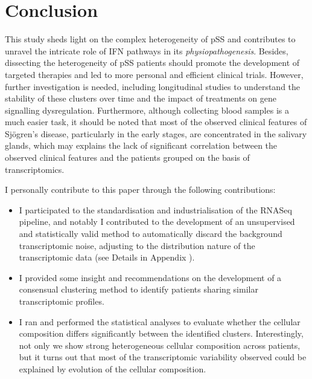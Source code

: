 \documentclass[mainlanguage=english,numlaboratories=2, nofrontcover=true,noaim=false, localbibs, colophon-location=verso-frontcover, oneside, 10pt, localtocs, version=final, nomakeabstract=true]{yathesis}
\begin{document}


\section{Conclusion}

This study sheds light on the complex heterogeneity of pSS and contributes to unravel the intricate role of IFN pathways in its \emph{physiopathogenesis}. Besides, dissecting the heterogeneity of pSS patients should promote the development of targeted therapies and led to more personal and efficient clinical trials. However, further investigation is needed, including longitudinal studies to understand the stability of these clusters over time and the impact of treatments on gene signalling dysregulation. Furthermore, although collecting blood samples is a much easier task, it should be noted that most of the observed clinical features of Sjögren's disease, particularly in the early stages, are concentrated in the salivary glands, which may explains the lack of significant correlation between the observed clinical features and the patients grouped on the basis of transcriptomics.


I personally contribute to this paper through the following contributions:
\begin{itemize}
\item I participated to the standardisation and industrialisation of the RNASeq pipeline, and notably I contributed to the development of an unsupervised and statistically valid method to automatically discard the background transcriptomic noise, adjusting to the distribution nature of the transcriptomic data (see Details in Appendix ).

\item I provided some insight and recommendations on the development of a consensual clustering method to identify patients sharing similar transcriptomic profiles. 

\item I ran and performed the statistical analyses to evaluate whether the cellular composition differs significantly between the identified clusters. Interestingly, not only we show strong heterogeneous cellular composition across patients, but it turns out that most of the transcriptomic variability observed could be explained by evolution of the cellular composition. 
\end{itemize}
\end{document}
